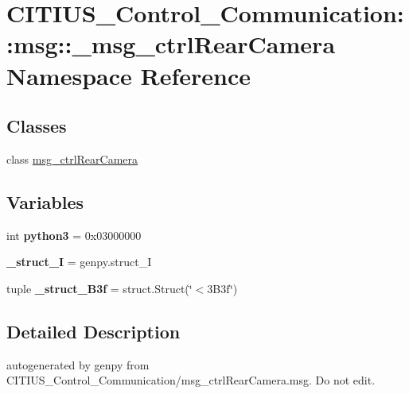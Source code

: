 \hypertarget{namespace_c_i_t_i_u_s___control___communication_1_1msg_1_1__msg__ctrl_rear_camera}{\section{\-C\-I\-T\-I\-U\-S\-\_\-\-Control\-\_\-\-Communication\-:\-:msg\-:\-:\-\_\-msg\-\_\-ctrl\-Rear\-Camera \-Namespace \-Reference}
\label{namespace_c_i_t_i_u_s___control___communication_1_1msg_1_1__msg__ctrl_rear_camera}
}
\subsection*{\-Classes}
\begin{DoxyCompactItemize}
\item 
class \hyperlink{class_c_i_t_i_u_s___control___communication_1_1msg_1_1__msg__ctrl_rear_camera_1_1msg__ctrl_rear_camera}{msg\-\_\-ctrl\-Rear\-Camera}
\end{DoxyCompactItemize}
\subsection*{\-Variables}
\begin{DoxyCompactItemize}
\item 
\hypertarget{namespace_c_i_t_i_u_s___control___communication_1_1msg_1_1__msg__ctrl_rear_camera_ac943d9564d1937ef7f14946227cbae88}{int {\bfseries python3} = 0x03000000}\label{namespace_c_i_t_i_u_s___control___communication_1_1msg_1_1__msg__ctrl_rear_camera_ac943d9564d1937ef7f14946227cbae88}

\item 
\hypertarget{namespace_c_i_t_i_u_s___control___communication_1_1msg_1_1__msg__ctrl_rear_camera_a65bf2c98a1697c13fcc9566036f780ad}{{\bfseries \-\_\-struct\-\_\-\-I} = genpy.\-struct\-\_\-\-I}\label{namespace_c_i_t_i_u_s___control___communication_1_1msg_1_1__msg__ctrl_rear_camera_a65bf2c98a1697c13fcc9566036f780ad}

\item 
\hypertarget{namespace_c_i_t_i_u_s___control___communication_1_1msg_1_1__msg__ctrl_rear_camera_a301175bad70c70eb6111cfbb37c97a36}{tuple {\bfseries \-\_\-struct\-\_\-B3f} = struct.\-Struct(\char`\"{}$<$3\-B3f\char`\"{})}\label{namespace_c_i_t_i_u_s___control___communication_1_1msg_1_1__msg__ctrl_rear_camera_a301175bad70c70eb6111cfbb37c97a36}

\end{DoxyCompactItemize}


\subsection{\-Detailed \-Description}
\begin{DoxyVerb}autogenerated by genpy from CITIUS_Control_Communication/msg_ctrlRearCamera.msg. Do not edit.\end{DoxyVerb}
 